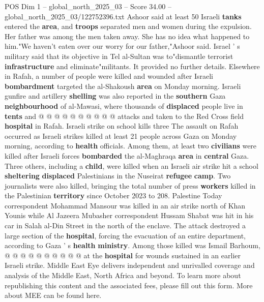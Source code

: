 \begin{textsample}{POS Dim 1 – global\_north\_2025\_03 – Score 34.00 – global\_north\_2025\_03/122752396.txt}
Ashoor said at least 50 Israeli \textbf{tanks} entered the \textbf{area}, and \textbf{troops} separated men and women during the expulsion.
Her father was among the men taken away.
She has no idea what happened to him."We haven't eaten over our worry for our father,"Ashoor said.
Israel ' s military said that its objective in Tel al-Sultan was to"dismantle terrorist \textbf{infrastructure} and eliminate"militants.
It provided no further details.
Elsewhere in Rafah, a number of people were killed and wounded after Israeli \textbf{bombardment} targeted the al-Shakoush \textbf{area} on Monday morning.
Israeli gunfire and artillery \textbf{shelling} was also reported in the \textbf{southern} Gaza \textbf{neighbourhood} of al-Mawasi, where thousands of \textbf{displaced} people live in \textbf{tents} and @ @ @ @ @ @ @ @ @ @ attacks and taken to the Red Cross field \textbf{hospital} in Rafah.
Israeli strike on school kills three The assault on Rafah occurred as Israeli strikes killed at least 21 people across Gaza on Monday morning, according to \textbf{health} officials.
Among them, at least two \textbf{civilians} were killed after Israeli forces \textbf{bombarded} the al-Maghraqa \textbf{area} in \textbf{central} Gaza.
Three others, including a \textbf{child}, were killed when an Israeli air strike hit a school \textbf{sheltering} \textbf{displaced} Palestinians in the Nuseirat \textbf{refugee} \textbf{camp}.
Two journalists were also killed, bringing the total number of press \textbf{workers} killed in the Palestinian \textbf{territory} since October 2023 to 208.
Palestine Today correspondent Mohammad Mansour was killed in an air strike north of Khan Younis while Al Jazeera Mubasher correspondent Hussam Shabat was hit in his car in Salah al-Din Street in the north of the enclave.
The attack destroyed a large section of the \textbf{hospital}, forcing the evacuation of an entire department, according to Gaza ' s \textbf{health} \textbf{ministry}.
Among those killed was Ismail Barhoum, @ @ @ @ @ @ @ @ @ @ at the \textbf{hospital} for wounds sustained in an earlier Israeli strike.
Middle East Eye delivers independent and unrivalled coverage and analysis of the Middle East, North Africa and beyond.
To learn more about republishing this content and the associated fees, please fill out this form.
More about MEE can be found here.

\end{textsample}
